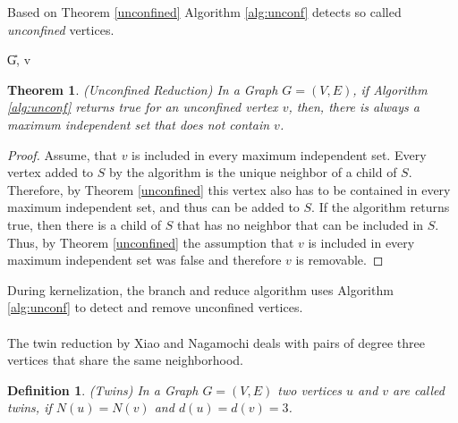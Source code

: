 \documentclass[]{article}
\newtheorem{theorem}{Theorem}
\newtheorem{definition}{Definition}
\begin{document}
Based on Theorem \ref{unconfined} Algorithm \ref{alg:unconf} detects so called \textit{unconfined} vertices.

\begin{algorithm}
	\caption{Unconfined -- Xiao and Nagamochi \cite{XiaoUnconfined}}\label{alg:unconf}
	\DontPrintSemicolon
	
	\U{G, v}	
	
	
\end{algorithm}


\begin{theorem}(Unconfined Reduction) In a Graph $G=(V,E)$, if Algorithm \ref{alg:unconf} returns true for an unconfined vertex $v$, then, there is always a maximum independent set that does not contain $v$.
\end{theorem}
\begin{proof}
	Assume, that $v$ is included in every maximum independent set. Every vertex added to $S$ by the algorithm is the unique neighbor of a child of $S$. Therefore, by Theorem \ref{unconfined} this vertex also has to be contained in every maximum independent set, and thus can be added to $S$. If the algorithm returns true, then there is a child of $S$ that has no neighbor that can be included in $S$. Thus, by Theorem \ref{unconfined} the assumption that $v$ is included in every maximum independent set was false and therefore $v$ is removable.
\end{proof}
During kernelization, the branch and reduce algorithm uses Algorithm \ref{alg:unconf} to detect and remove unconfined vertices.\paragraph{}
The twin reduction by Xiao and Nagamochi \cite{XiaoUnconfined} deals with pairs of degree three vertices that share the same neighborhood.

\begin{definition}(Twins)
	In a Graph $G=(V,E)$ two vertices $u$ and $v$ are called twins, if $N(u) = N(v)$ and $d(u) = d(v) = 3$.
\end{definition}
\end{document}
